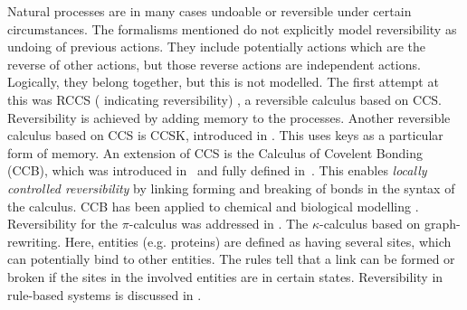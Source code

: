 Natural processes are in many cases undoable or reversible under certain circumstances. The formalisms mentioned do not explicitly model reversibility as undoing of previous actions. They include potentially actions which are the reverse of other actions, but those reverse actions are independent actions. Logically, they belong together, but this is not modelled. The first attempt at this was RCCS ( indicating reversibility) \cite{10.1007/978-3-540-28644-8_19}, a reversible calculus based on CCS. Reversibility is achieved by adding memory to the processes. Another reversible calculus based on CCS is CCSK, introduced in \cite{PHILLIPS200770}. This uses keys as a particular form of memory. An extension of CCS is the Calculus of Covelent Bonding (CCB), which was introduced in~\cite{KU16} and fully defined in~\cite{KU2017}. This enables \textit{locally controlled reversibility} by linking forming and breaking of bonds in the syntax of the calculus. CCB has been applied to chemical and biological modelling \cite{10.1007/978-3-319-99498-7_8, Kuhn2020ReversibilityIC}. Reversibility for the $\pi$-calculus was addressed in \cite{10.1007/978-3-642-15375-4_33}. The $\kappa$-calculus \cite{DANOS200469} based on graph-rewriting. Here, entities (e.g. proteins) are defined as having several sites, which can potentially bind to other entities. The rules tell that a link can be formed or broken if the sites in the involved entities are in certain states. Reversibility in rule-based systems is discussed in \cite{Aman2020}.
